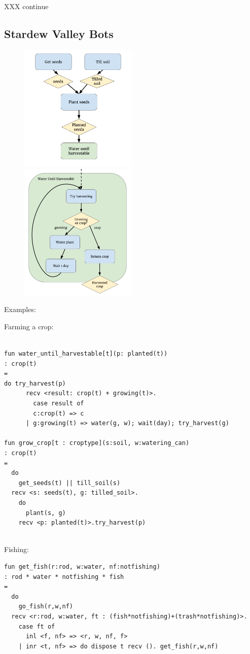XXX continue

\subsection{Stardew Valley Bots}

\begin{figure}
  \includegraphics[width=0.5\textwidth]{sdv-grow-crop.png}

  \includegraphics[width=0.5\textwidth]{sdv-water-harvest.png}
\end{figure}

Examples:

Farming a crop:
\begin{verbatim}

fun water_until_harvestable[t](p: planted(t))
: crop(t)
=
do try_harvest(p)
      recv <result: crop(t) + growing(t)>.
        case result of
        c:crop(t) => c
      | g:growing(t) => water(g, w); wait(day); try_harvest(g)

fun grow_crop[t : croptype](s:soil, w:watering_can)
: crop(t)
=
  do
    get_seeds(t) || till_soil(s)
  recv <s: seeds(t), g: tilled_soil>.
    do
      plant(s, g)
    recv <p: planted(t)>.try_harvest(p)
        
\end{verbatim}

Fishing:
\begin{verbatim}
fun get_fish(r:rod, w:water, nf:notfishing) 
: rod * water * notfishing * fish
=
  do  
    go_fish(r,w,nf)
  recv <r:rod, w:water, ft : (fish*notfishing)+(trash*notfishing)>.
    case ft of
      inl <f, nf> => <r, w, nf, f>
    | inr <t, nf> => do dispose t recv (). get_fish(r,w,nf)
\end{verbatim}


